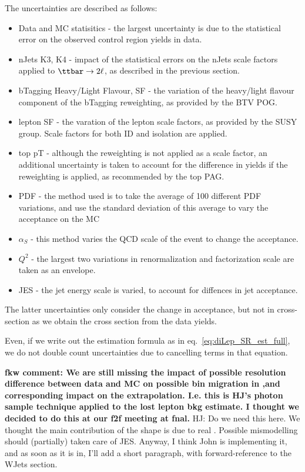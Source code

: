 The uncertainties are described as follows:
\begin{itemize}
  \item Data and MC statisitics - the largest uncertainty is due to the statistical error on the observed control region yields in data.
  \item nJets K3, K4 - impact of the statistical errors on the nJets scale factors applied to $\ttbar\to2\ell$, as described in the previous section. 
  \item bTagging Heavy/Light Flavour, SF - the variation of the heavy/light flavour component of the bTagging reweighting, as provided by the BTV POG.
  \item lepton SF - the varation of the lepton scale factors, as provided by the SUSY group.  Scale factors for both ID and isolation are applied.
  \item top pT  - although the reweighting is not applied as a scale factor, an additional uncertainty is taken to account for the difference in yields if the reweighting is applied, as recommended by the top PAG. 
  \item PDF - the method used is to take the average of 100 different PDF variations, and use the standard deviation of this average to vary the acceptance on the MC
  \item $\alpha_{S}$ - this method varies the QCD scale of the event to change the acceptance. 
  \item $Q^{2}$ - the largest two variations in renormalization and factorization scale are taken as an envelope.  
  \item JES - the jet energy scale is varied, to account for diffences in jet acceptance.  
\end{itemize}

The latter uncertainties only consider the change in acceptance, but not in cross-section as we obtain the cross section from the data yields.

Even, if we write out the estimation formula as in eq.~\ref{eq:diLep_SR_est_full}, we do not double count uncertainties due to cancelling terms in that equation.

{\bf fkw comment: We are still missing the impact of possible \MET resolution difference between data and MC on
     possible bin migration in \MET,and corresponding impact on the \MET extrapolation. I.e. this is HJ's photon sample
     technique applied to the lost lepton bkg estimate. I thought we decided to do this at our f2f meeting at fnal.}
{\color{red} HJ: Do we need this here. We thought the main contribution of the \MET shape is due to real \MET. Possible mismodelling should (partially) taken care of JES. Anyway, I think John is implementing it, and as soon as it is in, I'll add a short paragraph, with forward-reference to the WJets section.}

